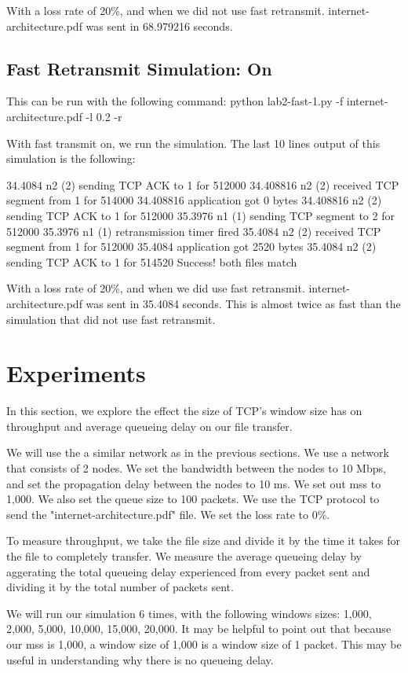 \documentclass[fleqn,11pt]{article}
\begin{document}
With a loss rate of 20\%, and when we did not use fast retransmit. internet-architecture.pdf was sent in 68.979216 seconds.

 \subsection{Fast Retransmit Simulation: On}
This can be run with the following command: python lab2-fast-1.py -f internet-architecture.pdf -l 0.2 -r

With fast transmit on, we run the simulation. The last 10 lines output of this simulation is the following:

34.4084 n2 (2) sending TCP ACK to 1 for 512000
34.408816 n2 (2) received TCP segment from 1 for 514000
34.408816 application got 0 bytes
34.408816 n2 (2) sending TCP ACK to 1 for 512000
35.3976 n1 (1) sending TCP segment to 2 for 512000
35.3976 n1 (1) retransmission timer fired
35.4084 n2 (2) received TCP segment from 1 for 512000
35.4084 application got 2520 bytes
35.4084 n2 (2) sending TCP ACK to 1 for 514520
Success! both files match

With a loss rate of 20\%, and when we did use fast retransmit. internet-architecture.pdf was sent in 35.4084 seconds. This is almost twice as fast than the simulation that did not use fast retransmit.

\section{Experiments}
In this section, we explore the effect the size of TCP's window size has on throughput and average queueing delay on our file transfer. 

We will use the a similar network as in the previous sections. We use a network that consists of 2 nodes. We set the bandwidth between the nodes to 10 Mbps, and set the propagation delay between the nodes to 10 ms. We set out mss to 1,000. We also set the queue size to 100 packets. We use the TCP protocol to send the "internet-architecture.pdf" file. We set the loss rate to 0\%.

To measure throughput, we take the file size and divide it by the time it takes for the file to completely transfer. We measure the average queueing delay by aggerating the total queueing delay experienced from every packet sent and dividing it by the total number of packets sent. 

We will run our simulation 6 times, with the following windows sizes: 1,000, 2,000, 5,000, 10,000, 15,000, 20,000. It may be helpful to point out that because our mss is 1,000, a window size of 1,000 is a window size of 1 packet. This may be useful in understanding why there is no queueing delay.
\end{document}
